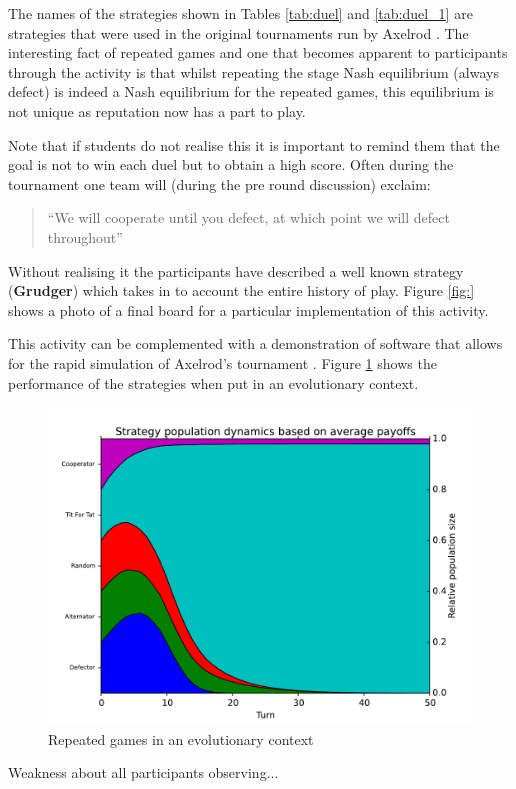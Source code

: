 \documentclass{article}
\begin{document}
The names of the strategies shown in Tables \ref{tab:duel} and \ref{tab:duel_1}
are strategies that were used in the original tournaments run by Axelrod
\cite{Axelrod1980a, Axelrod1980b}. The interesting fact of repeated games and
one that becomes apparent to participants through the activity is that whilst
repeating the stage Nash equilibrium (always defect) is indeed a Nash
equilibrium for the repeated games, this equilibrium is not unique as
reputation now has a part to play.

Note that if students do not realise this it is important to remind them that
the goal is not to win each duel but to obtain a high score. Often during the
tournament one team will (during the pre round discussion) exclaim:

\begin{quote}
   ``We will cooperate until you defect, at which point we will defect
throughout''
\end{quote}

Without realising it the participants have described a well known strategy
(\textbf{Grudger}) which takes in to account the entire history of play.
Figure \ref{fig:} shows a photo of a final board for a particular implementation
of this activity.

This activity can be complemented with a demonstration of software that allows
for the rapid simulation of Axelrod's tournament \cite{Knight2015}. Figure
\ref{fig:evolutionary_axelrod} shows the performance of the strategies when put
in an evolutionary context.

\begin{figure}[!hbtp]
    \centering
    \includegraphics[width=.6\textwidth]{static/basic_strategies-reproduce.pdf}
    \caption{Repeated games in an evolutionary context}
    \label{fig:evolutionary_axelrod}
\end{figure}

Weakness about all participants observing...
\end{document}
